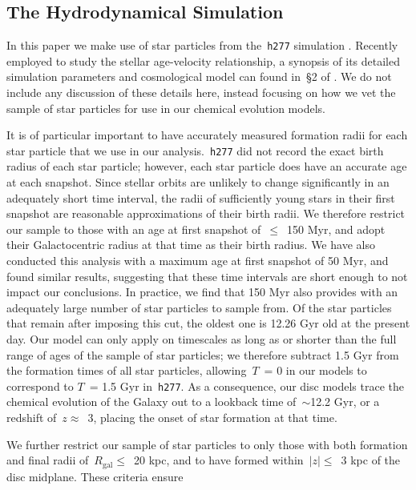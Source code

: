\documentclass[fleqn, usenatbib]{mnras}
\begin{document}
\subsection{The Hydrodynamical Simulation} 
\label{sec:methods:h277} 
In this paper we make use of star particles from the~\texttt{h277} simulation 
\citep{Christensen2012, Zolotov2012, Loebman2012, Loebman2014, Brooks2014}. 
Recently employed to study the stellar age-velocity relationship, a synopsis of 
its detailed simulation parameters and cosmological model can found in~\S 2 of 
\citet{Bird2020}. We do not include any discussion of these details here, 
instead focusing on how we vet the sample of star particles for use in our 
chemical evolution models. 
\par 
It is of particular important to have accurately measured formation radii for 
each star particle that we use in our analysis.~\texttt{h277} did not record 
the exact birth radius of each star particle; however, each star particle does 
have an accurate age at each snapshot. Since stellar orbits are unlikely to 
change significantly in an adequately short time interval, the radii of 
sufficiently young stars in their first snapshot are reasonable approximations 
of their birth radii. We therefore restrict our sample to those with an age at 
first snapshot of~$\leq$~150 Myr, and adopt their Galactocentric radius at that 
time as their birth radius. We have also conducted this analysis with a maximum 
age at first snapshot of 50 Myr, and found similar results, suggesting that 
these time intervals are short enough to not impact our conclusions. In 
practice, we find that 150 Myr also provides with an adequately large number of 
star particles to sample from. Of the star particles that remain after imposing 
this cut, the oldest one is 12.26 Gyr old at the present day. Our model can 
only apply on timescales as long as or shorter than the full range of ages of 
the sample of star particles; we therefore subtract 1.5 Gyr from the formation 
times of all star particles, allowing~$T$~= 0 in our models to correspond to 
$T$~= 1.5 Gyr in~\texttt{h277}. As a consequence, our disc models trace the 
chemical evolution of the Galaxy out to a lookback time of~$\sim$12.2 Gyr, or a 
redshift of~$z \approx$~3, placing the onset of star formation at that time. 
\par 
We further restrict our sample of star particles to only those with both 
formation and final radii of~$R_\text{gal} \leq$~20 kpc, and to have formed 
within~$\left|z\right|\leq$~3 kpc of the disc midplane. These criteria ensure 
\end{document}
